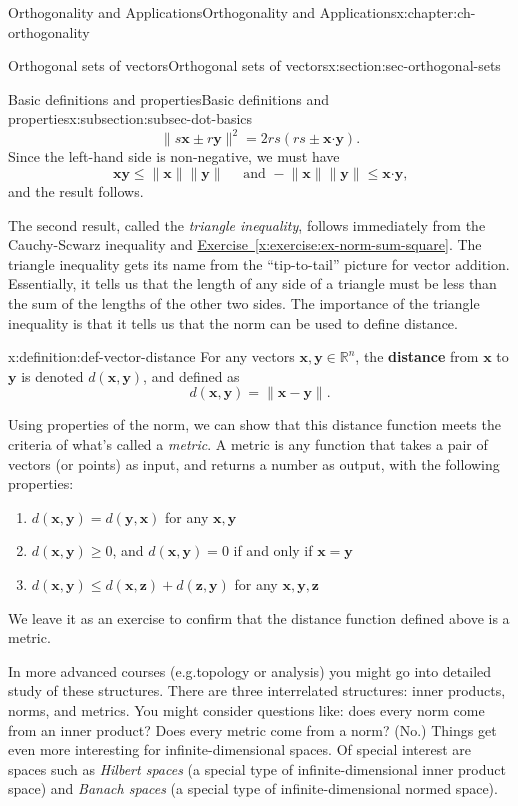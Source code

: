 \documentclass[oneside,10pt,]{book}
\newcommand{\xreffont}{\relax}
\newcommand{\terminology}[1]{\textbf{#1}}
\numberwithin{equation}{section}
\newcommand{\R}{\mathbb{R}}
\newcommand{\dotp}{\!\boldsymbol{\cdot}\!}
\newcommand{\len}[1]{\lVert #1\rVert}
\newcommand{\zz}{\mathbf{z}}
\newcommand{\xx}{\mathbf{x}}
\newcommand{\yy}{\mathbf{y}}
\begin{document}
\begin{chapterptx}{Orthogonality and Applications}{}{Orthogonality and Applications}{}{}{x:chapter:ch-orthogonality}
\begin{sectionptx}{Orthogonal sets of vectors}{}{Orthogonal sets of vectors}{}{}{x:section:sec-orthogonal-sets}
\begin{subsectionptx}{Basic definitions and properties}{}{Basic definitions and properties}{}{}{x:subsection:subsec-dot-basics}
\begin{equation*}
\len{s\xx\pm r\yy}^2 = 2rs(rs\pm\xx\dotp\yy)\text{.}
\end{equation*}
Since the left-hand side is non-negative, we must have%
\begin{equation*}
\xx\yy\leq \len{\xx}\len{\yy} \quad \text{ and } -\len{\xx}\len{\yy}\leq \xx\dotp\yy\text{,}
\end{equation*}
and the result follows.%
\par
The second result, called the  \emph{triangle inequality}, follows immediately from the Cauchy-Scwarz inequality and \hyperref[x:exercise:ex-norm-sum-square]{Exercise~{\xreffont\ref{x:exercise:ex-norm-sum-square}}}. The triangle inequality gets its name from the ``tip-to-tail'' picture for vector addition. Essentially, it tells us that the length of any side of a triangle must be less than the sum of the lengths of the other two sides. The importance of the triangle inequality is that it tells us that the norm can be used to define distance.%
\begin{definition}{}{x:definition:def-vector-distance}%
For any vectors \(\xx,\yy\in \R^n\), the \terminology{distance} from \(\xx\) to \(\yy\) is denoted \(d(\xx,\yy)\), and defined as%
\begin{equation*}
d(\xx,\yy) = \len{\xx-\yy}\text{.}
\end{equation*}
%
\end{definition}
Using properties of the norm, we can show that this distance function meets the criteria of what's called a \emph{metric}. A metric is any function that takes a pair of vectors (or points) as input, and returns a number as output, with the following properties:%
\begin{enumerate}
\item{}\(d(\xx,\yy)=d(\yy,\xx)\) for any \(\xx,\yy\)%
\item{}\(d(\xx,\yy)\geq 0\), and \(d(\xx,\yy)=0\) if and only if \(\xx=\yy\)%
\item{}\(d(\xx,\yy)\leq d(\xx,\zz)+d(\zz,\yy)\) for any \(\xx,\yy,\zz\)%
\end{enumerate}
We leave it as an exercise to confirm that the distance function defined above is a metric.%
\par
In more advanced courses (e.g.\@ topology or analysis) you might go into detailed study of these structures. There are three interrelated structures: inner products, norms, and metrics. You might consider questions like: does every norm come from an inner product? Does every metric come from a norm? (No.) Things get even more interesting for infinite-dimensional spaces. Of special interest are spaces such as \emph{Hilbert spaces} (a special type of infinite-dimensional inner product space) and \emph{Banach spaces} (a special type of infinite-dimensional normed space).%

\end{subsectionptx}
\end{sectionptx}
\end{chapterptx}
\end{document}
